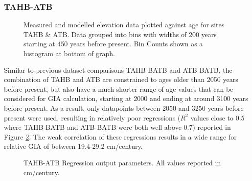 \subsubsection{TAHB-ATB}

\begin{figure}[H]
	\caption{Measured and modelled elevation data plotted against age for sites TAHB \& ATB. Data grouped into bins with widths of 200 years starting at 450 years before present. Bin Counts shown as a histogram at bottom of graph.}	
	\label{fig:data_TAHBxATB}
\end{figure}

Similar to previous dataset comparisons TAHB-BATB and ATB-BATB, the combination of TAHB and ATB are constrained to
ages older than
2050 years before present, but also have a much shorter range
of age values that
can be considered for GIA calculation, starting at 2000 and ending at around 3100 years before present.
As a result, only datapoints between 2050 and 3250 years before present
were used, resulting in
relatively poor regressions ($R^2$ values close to 0.5 where TAHB-BATB and ATB-BATB
were both well above 0.7) reported in Figure \ref{fig:TAHBxATB_regression}.
The weak correlation of these regressions results in a wide range for
relative GIA of between 19.4-29.2 cm/century. \\


\begin{figure}[H]
	\begin{flushleft}
	\end{flushleft}
	\caption{TAHB-ATB Regression output parameters. All values reported in cm/century.}
	\label{fig:TAHBxATB_regression}
\end{figure}


